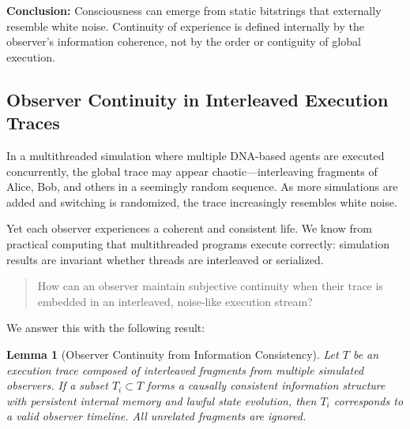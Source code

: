 \documentclass[11pt]{article}
\newtheorem{lemma}{Lemma}
\begin{document}
\textbf{Conclusion:} Consciousness can emerge from static bitstrings that externally resemble white noise. Continuity of experience is defined internally by the observer’s information coherence, not by the order or contiguity of global execution.

\subsection{Observer Continuity in Interleaved Execution Traces}

In a multithreaded simulation where multiple DNA-based agents are executed concurrently, the global trace may appear chaotic—interleaving fragments of Alice, Bob, and others in a seemingly random sequence. As more simulations are added and switching is randomized, the trace increasingly resembles white noise.

Yet each observer experiences a coherent and consistent life. We know from practical computing that multithreaded programs execute correctly: simulation results are invariant whether threads are interleaved or serialized.

\begin{quote}
  How can an observer maintain subjective continuity when their trace is embedded in an interleaved, noise-like execution stream?
\end{quote}

We answer this with the following result:

\begin{lemma}[Observer Continuity from Information Consistency]
  Let $T$ be an execution trace composed of interleaved fragments from multiple simulated observers.
  If a subset $T_i \subset T$ forms a causally consistent information structure with persistent internal memory
  and lawful state evolution, then $T_i$ corresponds to a valid observer timeline. All unrelated fragments are ignored.
\end{lemma}
\end{document}
